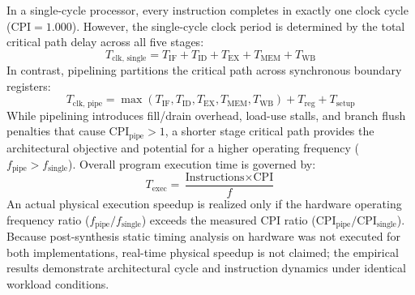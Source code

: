 \documentclass[conference]{IEEEtran}
\begin{document}
In a single-cycle processor, every instruction completes in exactly one clock cycle ($\text{CPI} = 1.000$). However, the single-cycle clock period is determined by the total critical path delay across all five stages:
\begin{equation}
T_{\text{clk, single}} = T_{\text{IF}} + T_{\text{ID}} + T_{\text{EX}} + T_{\text{MEM}} + T_{\text{WB}}
\end{equation}
In contrast, pipelining partitions the critical path across synchronous boundary registers:
\begin{equation}
T_{\text{clk, pipe}} = \max(T_{\text{IF}}, T_{\text{ID}}, T_{\text{EX}}, T_{\text{MEM}}, T_{\text{WB}}) + T_{\text{reg}} + T_{\text{setup}}
\end{equation}
While pipelining introduces fill/drain overhead, load-use stalls, and branch flush penalties that cause $\text{CPI}_{\text{pipe}} > 1$, a shorter stage critical path provides the architectural objective and potential for a higher operating frequency ($f_{\text{pipe}} > f_{\text{single}}$). Overall program execution time is governed by:
\begin{equation}
T_{\text{exec}} = \frac{\text{Instructions} \times \text{CPI}}{f}
\end{equation}
An actual physical execution speedup is realized only if the hardware operating frequency ratio ($f_{\text{pipe}} / f_{\text{single}}$) exceeds the measured CPI ratio ($\text{CPI}_{\text{pipe}} / \text{CPI}_{\text{single}}$). Because post-synthesis static timing analysis on hardware was not executed for both implementations, real-time physical speedup is not claimed; the empirical results demonstrate architectural cycle and instruction dynamics under identical workload conditions.
\end{document}
